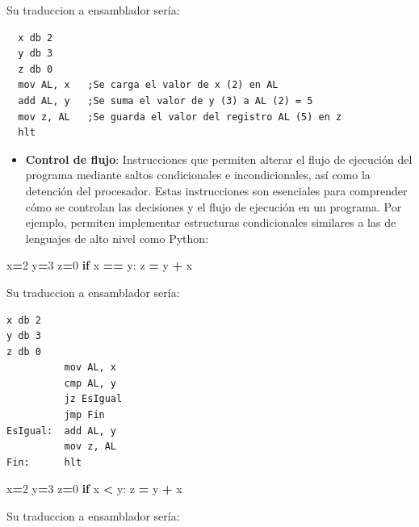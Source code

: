 \documentclass[12pt,oneside]{templates/unerthesis}
\newenvironment{Shaded}{\begin{snugshade}}{\end{snugshade}}
\newcommand{\ControlFlowTok}[1]{\textcolor[rgb]{0.13,0.29,0.53}{\textbf{#1}}}
\newcommand{\DecValTok}[1]{\textcolor[rgb]{0.00,0.00,0.81}{#1}}
\newcommand{\NormalTok}[1]{#1}
\newcommand{\OperatorTok}[1]{\textcolor[rgb]{0.81,0.36,0.00}{\textbf{#1}}}
\providecommand{\tightlist}{%
  \setlength{\itemsep}{0pt}\setlength{\parskip}{0pt}}
\begin{document}
Su traduccion a ensamblador sería:

\begin{lstlisting}
  x db 2
  y db 3
  z db 0
  mov AL, x   ;Se carga el valor de x (2) en AL
  add AL, y   ;Se suma el valor de y (3) a AL (2) = 5
  mov z, AL   ;Se guarda el valor del registro AL (5) en z 
  hlt\end{lstlisting}

\begin{itemize}
\tightlist
\item
  \textbf{Control de flujo}: Instrucciones que permiten alterar el flujo de ejecución del programa mediante saltos condicionales e incondicionales, así como la detención del procesador. Estas instrucciones son esenciales para comprender cómo se controlan las decisiones y el flujo de ejecución en un programa. Por ejemplo, permiten implementar estructuras condicionales similares a las de lenguajes de alto nivel como Python:
\end{itemize}

\begin{Shaded}
\begin{Highlighting}[]
\NormalTok{x}\OperatorTok{=}\DecValTok{2}
\NormalTok{y}\OperatorTok{=}\DecValTok{3}
\NormalTok{z}\OperatorTok{=}\DecValTok{0}
\ControlFlowTok{if}\NormalTok{ x }\OperatorTok{==}\NormalTok{ y:}
\NormalTok{  z }\OperatorTok{=}\NormalTok{ y  }\OperatorTok{+}\NormalTok{ x}
\end{Highlighting}
\end{Shaded}

Su traduccion a ensamblador sería:

\begin{lstlisting}
x db 2 
y db 3
z db 0
          mov AL, x
          cmp AL, y
          jz EsIgual
          jmp Fin
EsIgual:  add AL, y
          mov z, AL 
Fin:      hlt\end{lstlisting}

\begin{Shaded}
\begin{Highlighting}[]
\NormalTok{x}\OperatorTok{=}\DecValTok{2}
\NormalTok{y}\OperatorTok{=}\DecValTok{3}
\NormalTok{z}\OperatorTok{=}\DecValTok{0}
\ControlFlowTok{if}\NormalTok{ x }\OperatorTok{\textless{}}\NormalTok{ y:}
\NormalTok{  z }\OperatorTok{=}\NormalTok{ y  }\OperatorTok{+}\NormalTok{ x}
\end{Highlighting}
\end{Shaded}

Su traduccion a ensamblador sería:
\end{document}
